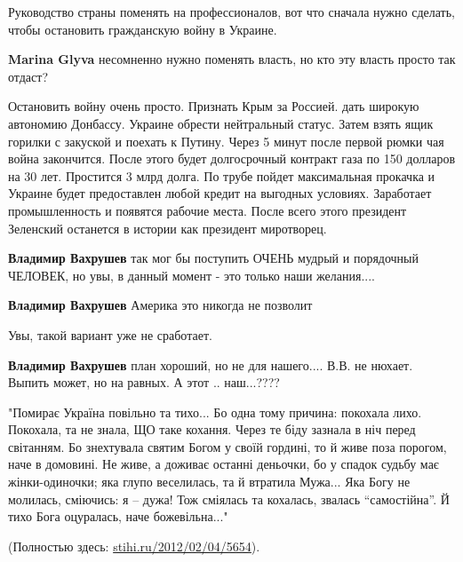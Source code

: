 \begin{itemize}

Руководство страны поменять на профессионалов, вот что сначала нужно сделать,
чтобы остановить гражданскую войну в Украине.

\begin{itemize} %
\textbf{Marina Glyva} несомненно нужно поменять власть, но кто эту власть просто так отдаст?
\end{itemize} %


Остановить войну очень просто. Признать Крым за Россией. дать широкую автономию
Донбассу. Украине обрести нейтральный статус. Затем взять ящик горилки с
закуской и поехать к Путину. Через 5 минут после первой рюмки чая война
закончится. После этого будет долгосрочный контракт газа по 150 долларов на 30
лет. Простится 3 млрд долга. По трубе пойдет максимальная прокачка и Украине
будет предоставлен любой кредит на выгодных условиях. Заработает промышленность
и появятся рабочие места. После всего этого президент Зеленский останется в
истории как президент миротворец.

\begin{itemize} %
\textbf{Владимир Вахрушев} так мог бы поступить ОЧЕНЬ мудрый и порядочный ЧЕЛОВЕК, но увы, в данный момент - это только наши желания....

\textbf{Владимир Вахрушев} Америка это никогда не позволит

Увы, такой вариант уже не сработает.

\textbf{Владимир Вахрушев} план хороший, но не для нашего.... В.В. не нюхает. Выпить может, но на равных. А этот .. наш...????
\end{itemize} %



\begin{multicols}{2}
\obeycr
"Помирає Україна
повільно та тихо...
Бо одна тому причина:
покохала лихо.
\smallskip
Покохала, та не знала,
ЩО таке кохання.
Через те біду зазнала
в ніч перед світанням.
\smallskip
Бо знехтувала святим Богом
у своїй гордині,
то й живе поза порогом,
наче в домовині.
\smallskip
Не живе, а доживає
останні деньочки,
бо у спадок судьбу має
жінки-одиночки;
\smallskip
яка глупо веселилась,
та й втратила Мужа...
Яка Богу не молилась,
сміючись: я – дужа!
\smallskip
Тож сміялась та кохалась,
звалась \enquote{самостійна}.
Й тихо Бога оцуралась,
наче божевільна..." 
\restorecr
\end{multicols}

(Полностью здесь: \url{stihi.ru/2012/02/04/5654}).

\end{itemize} %
